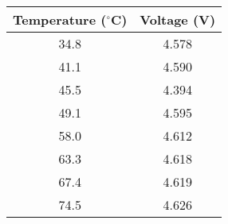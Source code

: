    \begin{tabular}{|c|c|} 
        \hline
        \textbf{Temperature ($^{\circ}$C)} & \textbf{Voltage (V)} \\
        \hline
        34.8 & 4.578 \\
        \hline
        41.1 & 4.590 \\
        \hline
        45.5 & 4.394 \\
        \hline
        49.1 & 4.595 \\
        \hline
        58.0 & 4.612 \\
        \hline
        63.3 & 4.618 \\
        \hline
        67.4 & 4.619 \\
        \hline
        74.5 & 4.626 \\
        \hline
    \end{tabular}
